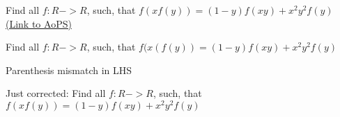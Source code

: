 \begin{problem}
	Find all $ f : R -> R$, such, that $ f(xf(y))=(1-y)f(xy)+x^2y^2f(y)$
	\flushright \href{https://artofproblemsolving.com/community/c6h1621947}{(Link to AoPS)}
\end{problem}



\begin{solution}
	\begin{tcolorbox}Find all $ f : R -> R$, such, that $ f(x(f(y))=(1-y)f(xy)+x^2y^2f(y)$\end{tcolorbox}

Parenthesis mismatch in LHS
\end{solution}



\begin{solution}
	Just corrected:
Find all $ f : R -> R$, such, that $ f(xf(y))=(1-y)f(xy)+x^2y^2f(y)$
\end{solution}



